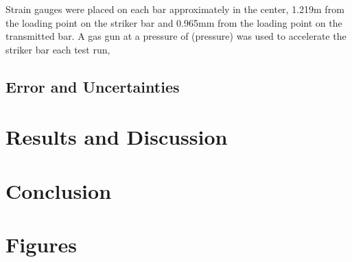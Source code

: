 \documentclass[12pt]{article}
\begin{document}
Strain gauges were placed on each bar approximately in the center, 1.219m from the loading point on the striker bar and 0.965mm from the loading point on the transmitted bar. A gas gun at a pressure of (pressure) was used to accelerate the striker bar each test run, 


\subsection{Error and Uncertainties} %

\section{Results and Discussion} %


\section{Conclusion} %


\section{Figures} %




\end{document}

